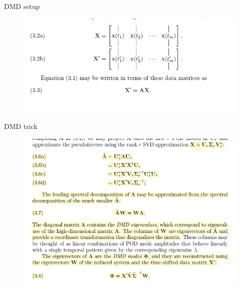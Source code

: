 \documentclass{beamer}
\begin{document}
\begin{frame}{DMD setup }
	\begin{figure}[h]
	\centering
		\includegraphics[scale=0.6]{../Figures/fig_dmd_fig1.png}
\end{figure}
\end{frame}

\begin{frame}{DMD trick}
\begin{figure}[h]
	\centering
		\includegraphics[scale=0.6]{../Figures/fig_dmd_fig2.png}
\end{figure}	
\end{frame}
\end{document}
